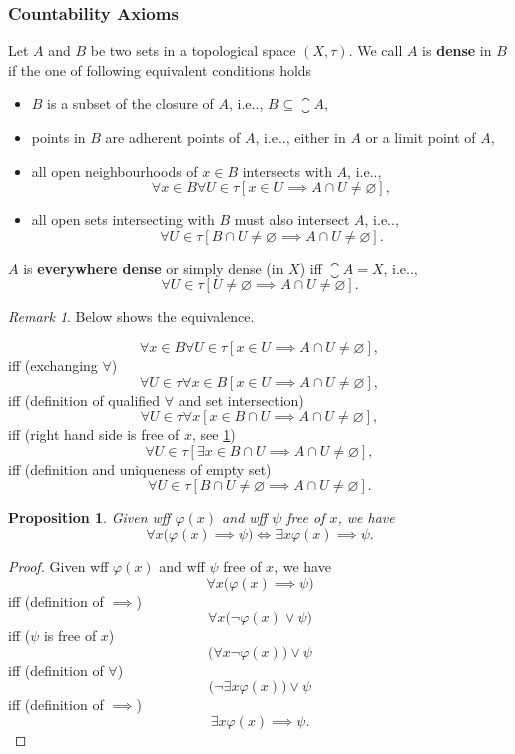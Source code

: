 \documentclass[12pt, letterpaper]{article}
\makeatletter
\newcommand\ie{i.e\@ifnextchar.{}{.\@}}
\renewcommand{\emptyset}{\varnothing}
\newtheorem{prop}{Proposition}[section]
\theoremstyle{definition}
\theoremstyle{remark}
\newtheorem*{rem*}{Remark}
\theoremstyle{definition}
\theoremstyle{plain}
\numberwithin{equation}{section}
\makeatother
\begin{document}
	\subsubsection{Countability Axioms}
	
	\begin{def*}[dense]
		Let $A$ and $B$ be two sets in a topological space $(X,\tau)$.
		We call $A$ is \textbf{dense} in $B$ if the one of following equivalent conditions holds
		\begin{itemize}
			\item $B$ is a subset of the closure of $A$, \ie, $B\subseteq\closure{A}$,
			\item points in $B$ are adherent points of $A$, \ie, either in $A$ or a limit point of $A$,
			\item all open neighbourhoods of $x\in B$ intersects with $A$, \ie,
			\[ \forall x\in B\forall U\in\tau[x\in  U \implies A\cap U\ne\emptyset ],\]
			\item all open sets intersecting with $B$ must also intersect $A$, \ie,
			\[ \forall U\in\tau[B\cap  U\ne\emptyset \implies A\cap U\ne\emptyset ].\]
		\end{itemize}
		 $A$ is \textbf{everywhere dense} or simply dense (in $X$) iff $\closure{A} = X$, \ie,
		 \[\forall U\in\tau[U\ne\emptyset\implies A\cap U\ne\emptyset ].\]
	\end{def*}
	\begin{rem*}
		Below shows the equivalence.
		
		\[ \forall x\in B\forall U\in\tau[x\in  U \implies A\cap U\ne\emptyset ],\]
		iff (exchanging $\forall$)
		\[ \forall U\in\tau\forall x\in B[x\in  U \implies A\cap U\ne\emptyset ],\]
		iff (definition of qualified $\forall$ and set intersection)
		\[ \forall U\in\tau\forall x[x\in B \cap  U \implies A\cap U\ne\emptyset ],\]
		iff (right hand side is free of $x$, see \ref{propExistsForall})
		\[ \forall U\in\tau[\exists x\in B \cap  U \implies A\cap U\ne\emptyset ],\]
		iff (definition and uniqueness of empty set)
		\[ \forall U\in\tau[B\cap  U\ne\emptyset \implies A\cap U\ne\emptyset ].\]
		
	\end{rem*}
	\begin{prop}\label{propExistsForall}
		Given wff $\varphi(x)$ and wff $\psi$ free of $x$, we have
		\[ \forall x \big(\varphi(x) \implies \psi \big) \iff \exists x \varphi(x) \implies \psi . \]
	\end{prop}
	\begin{proof}
		Given wff $\varphi(x)$ and wff $\psi$ free of $x$, we have
		\[ \forall x \big(\varphi(x) \implies \psi \big) \]
		iff (definition of $\implies$)
		\[ \forall x \big(\neg\varphi(x) \lor \psi \big) \]
		iff ($\psi$ is free of $x$)
		\[ \big(\forall x \neg\varphi(x)\big)  \lor \psi \]
		iff (definition of $\forall$)
		\[ \big(\neg\exists x \varphi(x)\big)  \lor \psi \]
		iff (definition of $\implies$)
		\[ \exists x \varphi(x) \implies \psi . \]
	\end{proof}
	
\end{document}
